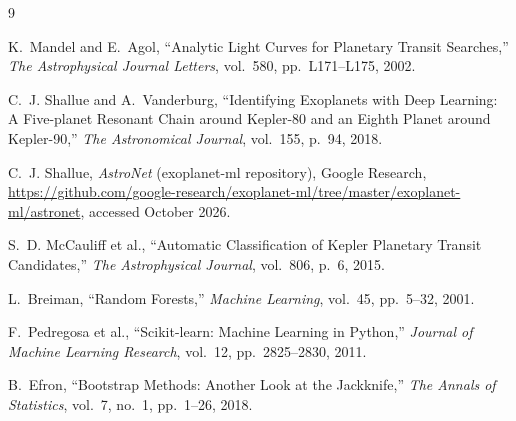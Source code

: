 \documentclass[11pt,a4paper]{article}
\begin{document}
\begin{thebibliography}{9}

K.~Mandel and E.~Agol,
``Analytic Light Curves for Planetary Transit Searches,''
\emph{The Astrophysical Journal Letters}, vol.~580, pp.~L171--L175, 2002.

C.~J. Shallue and A.~Vanderburg,
``Identifying Exoplanets with Deep Learning: A Five-planet Resonant Chain around
Kepler-80 and an Eighth Planet around Kepler-90,''
\emph{The Astronomical Journal}, vol.~155, p.~94, 2018.

C.~J. Shallue, \emph{AstroNet} (exoplanet-ml repository), Google Research,
\url{https://github.com/google-research/exoplanet-ml/tree/master/exoplanet-ml/astronet},
accessed October 2026.

S.~D. McCauliff et al.,
``Automatic Classification of Kepler Planetary Transit Candidates,''
\emph{The Astrophysical Journal}, vol.~806, p.~6, 2015.

L.~Breiman, ``Random Forests,''
\emph{Machine Learning}, vol.~45, pp.~5--32, 2001.

F.~Pedregosa et al.,
``Scikit-learn: Machine Learning in Python,''
\emph{Journal of Machine Learning Research}, vol.~12, pp.~2825--2830, 2011.

B.~Efron, ``Bootstrap Methods: Another Look at the Jackknife,''
\emph{The Annals of Statistics}, vol.~7, no.~1, pp.~1--26, 2018.

\end{thebibliography}
\end{document}
